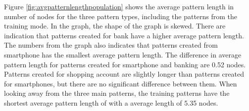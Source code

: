     Figure \ref{fig:avgpatternlengthpopulation} shows the average pattern length in number of nodes for the three pattern types, including the patterns from the training mode. In the graph, the shape of the graph is skewed. There are indication that patterns created for bank have a higher average pattern length. The numbers from the graph also indicates that patterns created from smartphone has the smallest average pattern length. The difference in average pattern length for patterns created for smartphone and banking are 0.52 nodes. Patterns created for shopping account are slightly longer than patterns created for smartphones, but there are no significant difference between them. When looking away from the three main patterns, the training patterns have the shortest average pattern length of with a average length of 5.35 nodes. 

